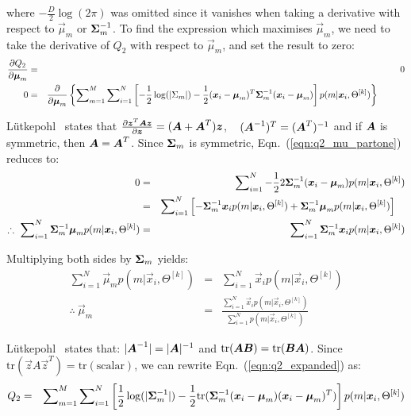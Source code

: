 \noindent
where $-\frac{D}{2} \log(2\pi)$ was omitted since it vanishes when taking a derivative with respect to $\Vec{\mu}_m$ or ${\boldsymbol{\Sigma}}^{-1}_m$.
To find the expression which maximises $\Vec{\mu}_m$, we need to take the derivative of $Q_2$ with respect to $\Vec{\mu}_m$, and set the result to zero:
%
\begin{eqnarray}
	\frac{\partial Q_2}{\partial {\boldsymbol{\mu}}_m} & = & 0   \\
 0 & = & \frac{\partial}{\partial {\boldsymbol{\mu}}_m} \left\{ \sum\nolimits_{m=1}^{M} \sum\nolimits_{i=1}^{N} \left[
					- \frac{1}{2} \log(|\Sigma_m|) - \frac{1}{2} ({\boldsymbol{x}}_i - {\boldsymbol{\mu}}_m)^T {\boldsymbol{\Sigma}}_m^{-1} ({\boldsymbol{x}}_i - {\boldsymbol{\mu}}_m)
					\right] p(m|{\boldsymbol{x}}_i, \Theta^{[k]}) \right\} ~~~ ~~~ ~~~  \label{eqn:q2_mu_partone}
\end{eqnarray}%

\noindent
L\"{u}tkepohl~\cite{Lutkepohl96} states that
\mbox{$\frac{ \partial {\boldsymbol{z}}^T {\boldsymbol{A}} {\boldsymbol{z}} }{ \partial {\boldsymbol{z}} } =  ({\boldsymbol{A}} + {\boldsymbol{A}}^T){\boldsymbol{z}}$},
~ $({\boldsymbol{A}}^{-1})^T = ({\boldsymbol{A}}^T)^{-1}$ and if ${\boldsymbol{A}}$ is symmetric, then ${\boldsymbol{A}} = {\boldsymbol{A}}^T$.
Since ${\boldsymbol{\Sigma}}_m$ is symmetric, Eqn.~(\ref{eqn:q2_mu_partone}) reduces to:
%
\begin{eqnarray}
	0 & = & \sum\nolimits_{i=1}^{N} - \frac{1}{2} 2 {\boldsymbol{\Sigma}}_m^{-1} ({\boldsymbol{x}}_i - {\boldsymbol{\mu}}_m) p(m|{\boldsymbol{x}}_i, \Theta^{[k]}) \\
	~ & = & \sum\nolimits_{i=1}^{N} \left[ - {\boldsymbol{\Sigma}}_m^{-1} {\boldsymbol{x}}_i p(m|{\boldsymbol{x}}_i, \Theta^{[k]}) + {\boldsymbol{\Sigma}}_m^{-1} {\boldsymbol{\mu}}_m p(m|{\boldsymbol{x}}_i, \Theta^{[k]})  \right] ~~~ \\
	\therefore ~ \sum\nolimits_{i=1}^{N} {\boldsymbol{\Sigma}}_m^{-1} {\boldsymbol{\mu}}_m p(m|{\boldsymbol{x}}_i, \Theta^{[k]}) & = & \sum\nolimits_{i=1}^{N} {\boldsymbol{\Sigma}}_m^{-1} {\boldsymbol{x}}_i p(m|{\boldsymbol{x}}_i, \Theta^{[k]}) 
\end{eqnarray}%

\noindent
Multiplying both sides by ${\boldsymbol{\Sigma}}_m$ yields:
%
\begin{eqnarray}
	\sum\nolimits_{i=1}^{N} \Vec{\mu}_m p(m|\Vec{x}_i, \Theta^{[k]}) & = & \sum\nolimits_{i=1}^{N} \Vec{x}_i p(m|\Vec{x}_i, \Theta^{[k]})  \\
\therefore ~ \Vec{\mu}_m & = & \frac{ \sum\nolimits_{i=1}^{N} \Vec{x}_i p(m|\Vec{x}_i, \Theta^{[k]}) }
								   { \sum\nolimits_{i=1}^{N} p(m|\Vec{x}_i, \Theta^{[k]}) }
\end{eqnarray}

\noindent
L\"{u}tkepohl~\cite{Lutkepohl96} states that:  
$|{\boldsymbol{A}}^{-1}| = |{\boldsymbol{A}}|^{-1}$ 
and 
$\mbox{tr}({\boldsymbol{A}}{\boldsymbol{B}}) = \mbox{tr}({\boldsymbol{B}}{\boldsymbol{A}})$.
Since $\mbox{tr}{(\Vec{z}A\Vec{z}^T)} = \mbox{tr}(\mbox{scalar})$,
we can rewrite Eqn.~(\ref{eqn:q2_expanded}) as:
%
\begin{eqnarray}
	Q_2 & = &   \sum\nolimits_{m=1}^{M} \sum\nolimits_{i=1}^{N} \left[
					\frac{1}{2} \log(|{\boldsymbol{\Sigma}}_m^{-1}|) - \frac{1}{2} \mbox{tr}({\boldsymbol{\Sigma}}_m^{-1} ({\boldsymbol{x}}_i - {\boldsymbol{\mu}}_m) ({\boldsymbol{x}}_i - {\boldsymbol{\mu}}_m)^T)
					\right] p(m|{\boldsymbol{x}}_i, \Theta^{[k]})  \label{eqn:q2_rewritten}
\end{eqnarray}

